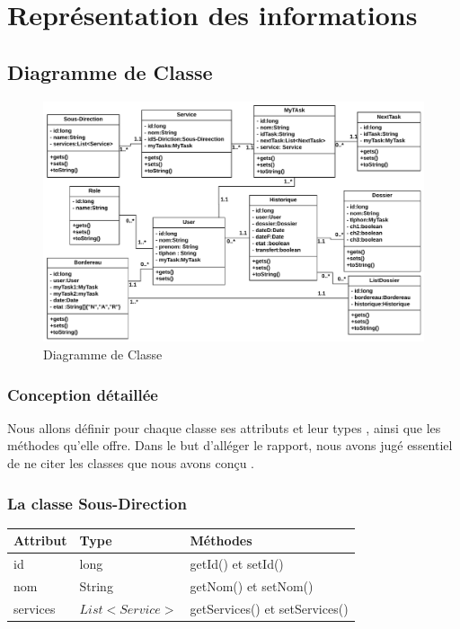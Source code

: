  \section{ Représentation des informations }
 \subsection{Diagramme de Classe}
\begin{figure}[H]
	\centering
	\includegraphics[width=1\linewidth]{images/class01}
	\caption{Diagramme de Classe}
	\label{fig:class01}
\end{figure}

  \subsubsection{Conception détaillée} 
Nous allons définir pour chaque classe ses attributs et leur types , ainsi que les méthodes qu’elle offre. Dans le but d’alléger le rapport, nous avons jugé essentiel de ne citer  les classes que nous avons conçu  .
 
 

\subsubsection*{La classe  Sous-Direction}
\begin{table}[H]
  \centering\setlength\tabcolsep{0.8cm}
	\begin{tabular}{|l|l|l|}
		\hline
		\textbf{Attribut}  & \textbf{Type} & \multicolumn{1}{l|}{\textbf{Méthodes}} \\ \hline
	
		id & long & getId() et setId()\\ \cline{1-2}
		nom & String  & getNom() et setNom() \\ \cline{1-2}
	services	& $ List<Service> $ & getServices() et setServices()   \\ \hline
	\end{tabular}
\end{table}
